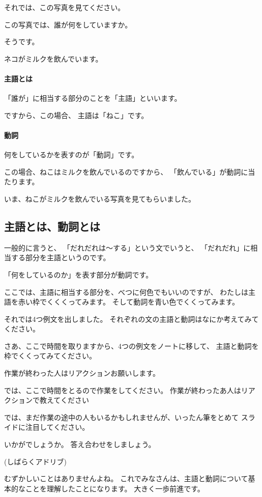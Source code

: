 \documentclass[book,jafontscale=0.9247]{jlreq}
\newcommand{\mySagyo}{%
\par%
\bigskip
では、ここで時間をとるので作業をしてください。
作業が終わったあ人はリアクションで教えてください\par%
\begin{minipage}[t]{.98\textwidth}
\mbox{}\hrulefill\mbox{}\par%
\mbox{}\hfill{}\raisebox{-.5\height}{作業}\hfill\mbox{}\par%
\mbox{}\hrulefill\mbox{}
\end{minipage}%
\par%
\bigskip%
では、まだ作業の途中の人もいるかもしれませんが、いったん筆をとめて
スライドに注目してください。%
\par%
\bigskip
}
\begin{document}
それでは、この写真を見てください。

この写真では、誰が何をしていますか。

そうです。

ネコがミルクを飲んでいます。

\paragraph{主語とは}
「誰が」に相当する部分のことを「主語」といいます。

ですから、この場合、
主語は「ねこ」です。

\paragraph{動詞}
何をしているかを表すのが「動詞」です。

この場合、ねこはミルクを飲んでいるのですから、
「飲んでいる」が動詞に当たります。

いま、ねこがミルクを飲んでいる写真を見てもらいました。

{\large \ComputerMouse}

\subsection{主語とは、動詞とは}


一般的に言うと、
「だれだれは〜する」という文でいうと、
「だれだれ」に相当する部分を主語というのです。

「何をしているのか」を表す部分が動詞です。

ここでは、主語に相当する部分を、べつに何色でもいいのですが、
わたしは主語を赤い枠でくくくってみます。
そして動詞を青い色でくくってみます。

{\large \ComputerMouse}

それでは4つ例文を出しました。
それぞれの文の主語と動詞はなにか考えてみてください。

さあ、ここで時間を取りますから、4つの例文をノートに移して、
主語と動詞を枠でくくってみてください。

作業が終わった人はリアクションお願いします。


\mySagyo


いかがでしょうか。
答え合わせをしましょう。

{\large \ComputerMouse}

(しばらくアドリブ)

むずかしいことはありませんよね。
これでみなさんは、主語と動詞について基本的なことを理解したことになります。
大きく一歩前進です。
\end{document}
